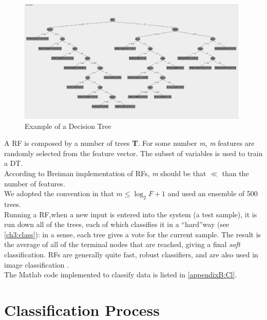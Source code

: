 \begin{figure}[!hbt]
  \centering
    \includegraphics[width=0.98\textwidth]{./images/DT_example.png}
  \caption{Example of a Decision Tree}
  \label{ch4:fig6}
\end{figure}

A \Gls{RF} is composed by a number of trees \textbf{T}. For some number \textit{m}, \textit{m} features are randomly selected from the feature vector.
The subset of variables is used to train a \Gls{DT}.\\
According to Breiman implementation of \Glspl{RF}, \textit{m} should be that  $\ll$ than the number of features.\\
We adopted the convention in \cite{randForests03} that $m \leq \log_2 F +1$ and used an ensemble of 500 trees.\\
Running a \Gls{RF},when a new input is entered into the system (a test sample), it is run down all of the trees, each of which classifies
it in a \textquotedblleft hard\textquotedblright way (see \ref{ch3:class}): in a sense, each tree gives a vote for the current sample. 
The result is the average  of all of the terminal nodes that are reached, giving a final \textit{soft} classification.
\Glspl{RF} are generally quite fast, robust classifiers, and are also used in image classification \cite{randForests04}.
\\
The Matlab code implemented to classify data is listed in \ref{appendixB:Cl}.

\vspace{0.5cm}


\section{Classification Process}

